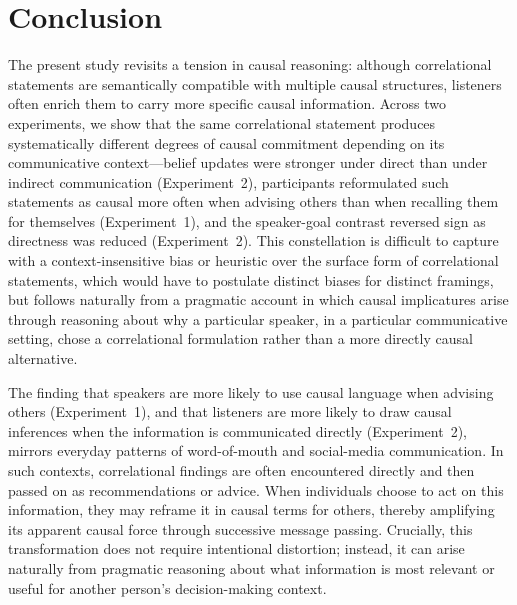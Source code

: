 \documentclass[10pt,letterpaper]{article}
\begin{document}
\section{Conclusion}

The present study revisits a tension in causal reasoning: although correlational statements are semantically compatible with multiple causal structures, listeners often enrich them to carry more specific causal information. Across two experiments, we show that the same correlational statement produces systematically different degrees of causal commitment depending on its communicative context---belief updates were stronger under direct than under indirect communication (Experiment~2), participants reformulated such statements as causal more often when advising others than when recalling them for themselves (Experiment~1), and the speaker-goal contrast reversed sign as directness was reduced (Experiment~2). This constellation is difficult to capture with a context-insensitive bias or heuristic over the surface form of correlational statements, which would have to postulate distinct biases for distinct framings, but follows naturally from a pragmatic account in which causal implicatures arise through reasoning about why a particular speaker, in a particular communicative setting, chose a correlational formulation rather than a more directly causal alternative.


The finding that speakers are more likely to use causal language when advising others (Experiment~1), and that listeners are more likely to draw causal inferences when the information is communicated directly (Experiment~2), mirrors everyday patterns of word-of-mouth and social-media communication. In such contexts, correlational findings are often encountered directly and then passed on as recommendations or advice. When individuals choose to act on this information, they may reframe it in causal terms for others, thereby amplifying its apparent causal force through successive message passing. Crucially, this transformation does not require intentional distortion; instead, it can arise naturally from pragmatic reasoning about what information is most relevant or useful for another person’s decision-making context.
\end{document}
